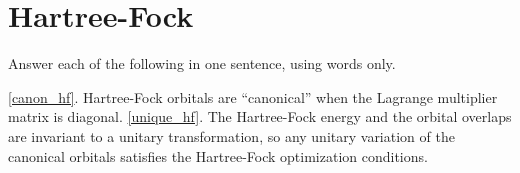 \chapter{Hartree-Fock}

\begin{Exercise}
    Answer each of the following in one sentence, using words only.
    \label{canon_hf}
    \label{unique_hf}
\end{Exercise}

\begin{Answer}
    \ref{canon_hf}. Hartree-Fock orbitals are ``canonical'' when the Lagrange multiplier matrix is diagonal.
    \ref{unique_hf}. The Hartree-Fock energy and the orbital overlaps are invariant to a unitary transformation, so any unitary variation of the canonical orbitals satisfies the Hartree-Fock optimization conditions.
\end{Answer}


    

